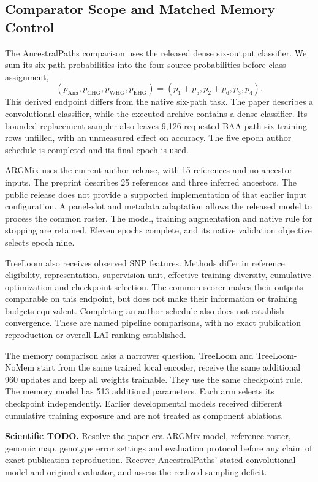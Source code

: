 \documentclass[letterpaper]{article}
\newcommand{\todo}[1]{\par\noindent\textbf{Scientific TODO.} #1\par}
\begin{document}
\subsection{Comparator Scope and Matched Memory Control}
The AncestralPaths comparison uses the released dense six-output classifier. We sum its six path probabilities into the four source probabilities before class assignment,
\begin{equation}
(p_{\mathrm{Ana}},p_{\mathrm{CHG}},p_{\mathrm{WHG}},p_{\mathrm{EHG}})
=(p_1+p_5,p_2+p_6,p_3,p_4).
\end{equation}
This derived endpoint differs from the native six-path task. The paper describes a convolutional classifier, while the executed archive contains a dense classifier. Its bounded replacement sampler also leaves 9,126 requested BAA path-six training rows unfilled, with an unmeasured effect on accuracy. The five epoch author schedule is completed and its final epoch is used.

ARGMix uses the current author release, with 15 references and no ancestor inputs. The preprint describes 25 references and three inferred ancestors. The public release does not provide a supported implementation of that earlier input configuration. A panel-slot and metadata adaptation allows the released model to process the common roster. The model, training augmentation and native rule for stopping are retained. Eleven epochs complete, and its native validation objective selects epoch nine.

TreeLoom also receives observed SNP features. Methods differ in reference eligibility, representation, supervision unit, effective training diversity, cumulative optimization and checkpoint selection. The common scorer makes their outputs comparable on this endpoint, but does not make their information or training budgets equivalent. Completing an author schedule also does not establish convergence. These are named pipeline comparisons, with no exact publication reproduction or overall LAI ranking established.

The memory comparison asks a narrower question. TreeLoom and TreeLoom-NoMem start from the same trained local encoder, receive the same additional 960 updates and keep all weights trainable. They use the same checkpoint rule. The memory model has 513 additional parameters. Each arm selects its checkpoint independently. Earlier developmental models received different cumulative training exposure and are not treated as component ablations.

\todo{Resolve the paper-era ARGMix model, reference roster, genomic map, genotype error settings and evaluation protocol before any claim of exact publication reproduction. Recover AncestralPaths' stated convolutional model and original evaluator, and assess the realized sampling deficit.}
\end{document}
